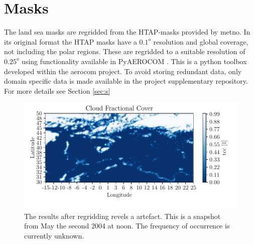 \section{Masks} \label{sec:mask}
The land sea masks are regridded from the HTAP-masks provided by \acrfull{metno}. In its original format the HTAP masks have a $0.1^o$ resolution and global coverage, not including the polar regions. These are regridded to a suitable resolution of $0.25^o$ using functionality available in PyAEROCOM \cite{pyaerocom}. %
This is a python toolbox developed within the \acrfull{aerocom} project.
To avoid storing redundant data, only domain specific data is made available in the project supplementary repository. For more details see Section \ref{sec:s}
\begin{figure}
    \centering
    \includegraphics{python_figs/example_artefact.pdf}
    \caption[Artefact in European Cloud Cover dataset.]{The results after regridding revels a artefact. This is a snapshot from May the second 2004 at noon. The frequency of occurrence is currently unknown.}
    \label{fig:example_artefact}
\end{figure}
